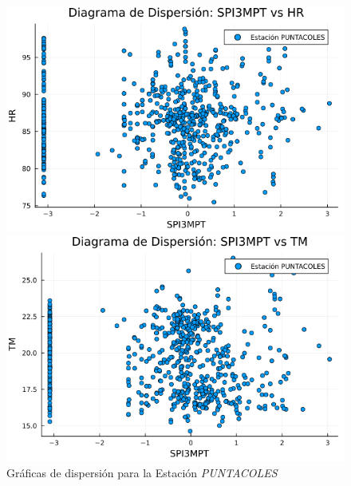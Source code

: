 \begin{figure}[htbp]
\centering
\caption{Gráficas de dispersión para la Estación \textit{PUNTACOLES}}
\begin{minipage}{0.32\textwidth}
    \centering
    \includegraphics[width=\linewidth]{Capitulos/Scaterplot/PUNTACOLES_SPI3MPT_vs_HR.png}
\end{minipage}\hfill
\begin{minipage}{0.32\textwidth}
    \centering
    \includegraphics[width=\linewidth]{Capitulos/Scaterplot/PUNTACOLES_SPI3MPT_vs_TM.png}
\end{minipage}\hfill
\begin{minipage}{0.32\textwidth}
    \centering

\end{minipage}
\end{figure}
